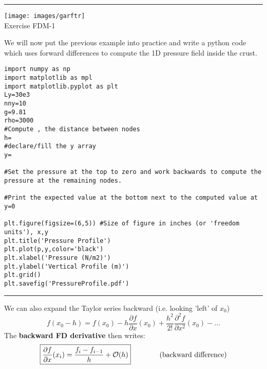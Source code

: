 \begin{center}
\begin{minipage}[t]{0.77\textwidth}
\par\noindent\rule{\textwidth}{0.4pt}

\begin{center}
\texttt{[image: images/garftr]} \\
{\color{orange}Exercise FDM-1}
\end{center}

We will now put the previous example into practice and write a 
python code which uses forward differences to compute the 1D pressure
field inside the crust.

\begin{verbatim}
import numpy as np
import matplotlib as mpl 
import matplotlib.pyplot as plt 
Ly=30e3
nny=10
g=9.81
rho=3000
#Compute , the distance between nodes
h=
#declare/fill the y array 
y=

#Set the pressure at the top to zero and work backwards to compute the pressure at the remaining nodes.

#Print the expected value at the bottom next to the computed value at y=0

plt.figure(figsize=(6,5)) #Size of figure in inches (or 'freedom units'), x,y
plt.title('Pressure Profile')
plt.plot(p,y,color='black')
plt.xlabel('Pressure (N/m2)')
plt.ylabel('Vertical Profile (m)')
plt.grid()
plt.savefig('PressureProfile.pdf')
\end{verbatim}

\par\noindent\rule{\textwidth}{0.4pt}
\end{minipage}
\end{center}


\newpage

\noindent We can also expand the Taylor series backward (i.e. looking 'left' of $x_0$)
\begin{equation}
f(x_0-h)=f(x_0)-
h \frac{\partial f}{\partial x}(x_0)  + 
\frac{h^2}{2!} \frac{\partial^2 f}{\partial x^2}(x_0)  -
\dots 
\end{equation}
The {\bf backward FD derivative} then writes:
\begin{equation}
\boxed{
\frac{\partial f}{\partial x}(x_i) = \frac{f_{i}-f_{i-1}}{h} + {\cal O}(h) 
}
\qquad
\qquad
\text{(backward difference)} 
\end{equation}




